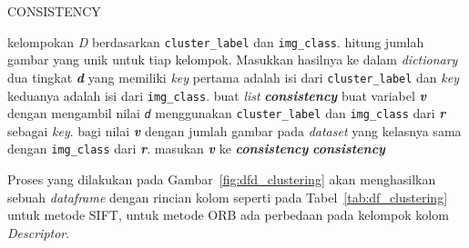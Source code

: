 \begin{algorithm}[H]
	\caption{CONSISTENCY}
	\label{alg:consistency}
	\begin{algorithmic}[1]
		\STATE kelompokan \textit{D} berdasarkan \texttt{cluster\_label} dan \texttt{img\_class}.
		\STATE hitung jumlah gambar yang unik untuk tiap kelompok. Masukkan hasilnya ke dalam \textit{dictionary} dua tingkat \textit{\textbf{d}} yang memiliki \textit{key} pertama adalah isi dari \texttt{cluster\_label} dan \textit{key} keduanya adalah isi dari \texttt{img\_class}.
		\STATE buat \textit{list} \textit{\textbf{consistency}}
		\STATE buat variabel \textit{\textbf{v}} dengan mengambil nilai \textit{\texttt{d}} menggunakan \texttt{cluster\_label} dan \texttt{img\_class} dari \textit{\textbf{r}} sebagai \textit{key}.
		\STATE bagi nilai \textit{\textbf{v}} dengan jumlah gambar pada \textit{dataset} yang kelasnya sama dengan \texttt{img\_class} dari \textit{\textbf{r}}.
		\STATE masukan \textit{\textbf{v}} ke \textit{\textbf{consistency}}
		\ENDFOR
		\RETURN \textit{\textbf{consistency}}
	\end{algorithmic}
\end{algorithm}
Proses yang dilakukan pada Gambar~\ref{fig:dfd_clustering} akan menghasilkan sebuah \textit{dataframe} dengan rincian kolom seperti pada Tabel~\ref{tab:df_clustering} untuk metode SIFT, untuk metode ORB ada perbedaan pada kelompok kolom \textit{Descriptor}. 
